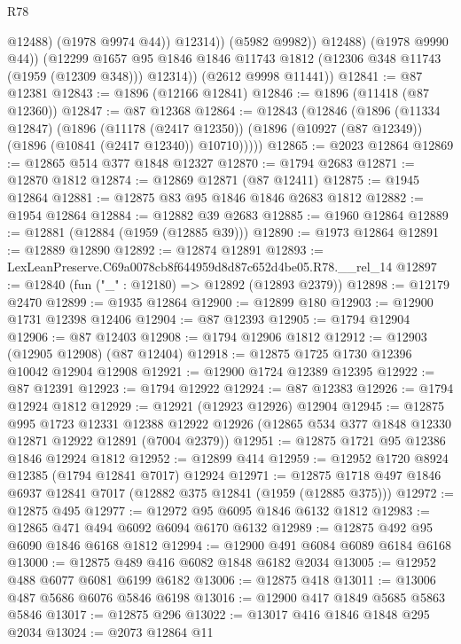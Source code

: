 \begin{lexlean}{R78}
\begin{coremodule}
                      @12488)
                    (@1978 @9974 @44))
                  @12314))
              (@5982 @9982))
            @12488)
          (@1978 @9990 @44))
        (@12299
          @1657
          @95
          @1846
          @1846
          @11743
          @1812
          (@12306 @348 @11743 (@1959 (@12309 @348)))
          @12314))
      (@2612 @9998 @11441))
@12841 := @87 @12381
@12843 := @1896 (@12166 @12841)
@12846 := @1896 (@11418 (@87 @12360))
@12847 := @87 @12368
@12864 := @12843
    (@12846
      (@1896
        (@11334 @12847)
        (@1896
          (@11178 (@2417 @12350))
          (@1896 (@10927 (@87 @12349)) (@1896 (@10841 (@2417 @12340)) @10710)))))
@12865 := @2023 @12864
@12869 := @12865 @514 @377 @1848 @12327
@12870 := @1794 @2683
@12871 := @12870 @1812
@12874 := @12869 @12871 (@87 @12411)
@12875 := @1945 @12864
@12881 := @12875 @83 @95 @1846 @1846 @2683 @1812
@12882 := @1954 @12864
@12884 := @12882 @39 @2683
@12885 := @1960 @12864
@12889 := @12881 (@12884 (@1959 (@12885 @39)))
@12890 := @1973 @12864
@12891 := @12889 @12890
@12892 := @12874 @12891
@12893 := LexLeanPreserve.C69a0078cb8f644959d8d87c652d4be05.R78.__rel_14
@12897 := @12840 (fun ("_" : @12180) => @12892 (@12893 @2379))
@12898 := @12179 @2470
@12899 := @1935 @12864
@12900 := @12899 @180
@12903 := @12900 @1731 @12398 @12406
@12904 := @87 @12393
@12905 := @1794 @12904
@12906 := @87 @12403
@12908 := @1794 @12906 @1812
@12912 := @12903 (@12905 @12908) (@87 @12404)
@12918 := @12875 @1725 @1730 @12396 @10042 @12904 @12908
@12921 := @12900 @1724 @12389 @12395
@12922 := @87 @12391
@12923 := @1794 @12922
@12924 := @87 @12383
@12926 := @1794 @12924 @1812
@12929 := @12921 (@12923 @12926) @12904
@12945 := @12875
    @995
    @1723
    @12331
    @12388
    @12922
    @12926
    (@12865 @534 @377 @1848 @12330 @12871 @12922 @12891 (@7004 @2379))
@12951 := @12875 @1721 @95 @12386 @1846 @12924 @1812
@12952 := @12899 @414
@12959 := @12952 @1720 @8924 @12385 (@1794 @12841 @7017) @12924
@12971 := @12875 @1718 @497 @1846 @6937 @12841 @7017 (@12882 @375 @12841 (@1959 (@12885 @375)))
@12972 := @12875 @495
@12977 := @12972 @95 @6095 @1846 @6132 @1812
@12983 := @12865 @471 @494 @6092 @6094 @6170 @6132
@12989 := @12875 @492 @95 @6090 @1846 @6168 @1812
@12994 := @12900 @491 @6084 @6089 @6184 @6168
@13000 := @12875 @489 @416 @6082 @1848 @6182 @2034
@13005 := @12952 @488 @6077 @6081 @6199 @6182
@13006 := @12875 @418
@13011 := @13006 @487 @5686 @6076 @5846 @6198
@13016 := @12900 @417 @1849 @5685 @5863 @5846
@13017 := @12875 @296
@13022 := @13017 @416 @1846 @1848 @295 @2034
@13024 := @2073 @12864 @11

\end{coremodule}
\end{lexlean}
